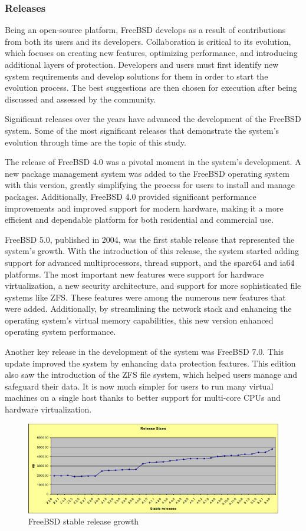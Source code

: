 \documentclass[12pt, dvipsnames, a4paper]{article}
\begin{document}
\subsubsection{Releases}
Being an open-source platform, FreeBSD develops as a result of contributions from both its users and its developers. Collaboration is critical to its evolution, which focuses on creating new features, optimizing performance, and introducing additional layers of protection. Developers and users must first identify new system requirements and develop solutions for them in order to start the evolution process. The best suggestions are then chosen for execution after being discussed and assessed by the community.

Significant releases over the years have advanced the development of the FreeBSD system. Some of the most significant releases that demonstrate the system's evolution through time are the topic of this study.


The release of FreeBSD 4.0 was a pivotal moment in the system's development. A new package management system was added to the FreeBSD operating system with this version, greatly simplifying the process for users to install and manage packages. Additionally, FreeBSD 4.0 provided significant performance improvements and improved support for modern hardware, making it a more efficient and dependable platform for both residential and commercial use.


FreeBSD 5.0, published in 2004, was the first stable release that represented the system's growth. With the introduction of this release, the system started adding support for advanced multiprocessors, thread support, and the sparc64 and ia64 platforms. The most important new features were support for hardware virtualization, a new security architecture, and support for more sophisticated file systems like ZFS. These features were among the numerous new features that were added. Additionally, by streamlining the network stack and enhancing the operating system's virtual memory capabilities, this new version enhanced operating system performance.


Another key release in the development of the system was FreeBSD 7.0. This update improved the system by enhancing data protection features. This edition also saw the introduction of the ZFS file system, which helped users manage and safeguard their data. It is now much simpler for users to run many virtual machines on a single host thanks to better support for multi-core CPUs and hardware virtualization.
\begin{figure}[h]
	\center
	\includegraphics[width=350pt]{assets/other_diagrams/release_graph.png}
	\caption{FreeBSD stable release growth \cite{Bieman}}
\end{figure}
\end{document}

